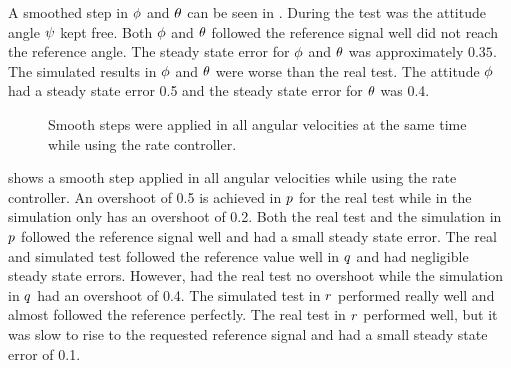 A smoothed step in $\phi$ and $\theta$ can be seen in . During the test was the attitude angle $\psi$ kept free. Both $\phi$ and $\theta$ followed the reference signal well did not reach the reference angle. The steady state error for $\phi$ and $\theta$ was approximately $0.35$. The simulated results in $\phi$ and $\theta$ were worse than the real test. The attitude $\phi$ had a steady state error 0.5 and the steady state error for $\theta$ was 0.4.

\begin{figure}
\centering
  \qquad
  \qquad
  \qquad
  \qquad
  \qquad
  \caption{\label{fig:StepAllRate}%
  Smooth steps were applied in all angular velocities at the same time while using the rate controller.}
\end{figure}

 shows a smooth step applied in all angular velocities while using the rate controller. An overshoot of 0.5 is achieved in $p$ for the real test while in the simulation only has an overshoot of 0.2. Both the real test and the simulation in $p$ followed the reference signal well and had a small steady state error. The real and simulated test followed the reference value well in $q$ and had negligible steady state errors. However, had the real test no overshoot while the simulation in $q$ had an overshoot of 0.4. The simulated test in $r$ performed really well and almost followed the reference perfectly. The real test in $r$ performed well, but it was slow to rise to the requested reference signal and had a small steady state error of 0.1. 

